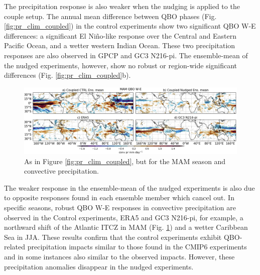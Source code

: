 The precipitation response is also weaker when the nudging is applied to the couple setup.
The annual mean difference between QBO phases (Fig. \ref{fig:pr_clim_coupled}) in the control experiments show two significant QBO W-E differences: a significant El Niño-like response over the Central and Eastern Pacific Ocean, and a wetter western Indian Ocean. 
These two precipitation responses are also observed in GPCP and GC3 N216-pi. 
The ensemble-mean of the nudged experiments, however, show no robust or region-wide significant differences (Fig. \ref{fig:pr_clim_coupled}b).

\begin{figure}[t!]
\centering
 \includegraphics[width=\linewidth]{figures/conv_prseasonal_mamqbowqboe.png}
\caption[SST response in DJF to the QBO in coupled nudged experiments]{ As in Figure \ref{fig:pr_clim_coupled}, but for the MAM season and convective precipitation.}
\label{fig:pr_mam_coupled}
\end{figure}

The weaker response in the ensemble-mean of the nudged experiments is also due to opposite responses found in each ensemble member which cancel out. In specific seasons, robust QBO W-E responses in convective precipitation are observed in the Control experiments, ERA5 and GC3 N216-pi, for example, a northward shift of the Atlantic ITCZ in MAM (Fig. \ref{fig:pr_mam_coupled}) and a wetter Caribbean Sea in JJA. These results confirm that the control experiments exhibit QBO-related precipitation impacts similar to those found in the CMIP6 experiments and in some instances also similar to the observed impacts. However, these precipitation anomalies disappear in the nudged experiments.

